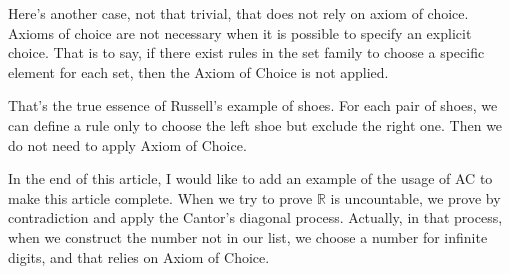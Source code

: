 \documentclass{article}
\newcommand\Real{\mathbb{R}}
\begin{document}
Here's another case, not that trivial, that does not rely on axiom of choice. Axioms of choice are not necessary when it is possible to specify an explicit choice. That is to say, if there exist rules in the set family to choose a specific element for each set, then the Axiom of Choice is not applied.

That's the true essence of Russell's example of shoes. For each pair of shoes, we can define a rule only to choose the left shoe but exclude the right one. Then we do not need to apply Axiom of Choice.

In the end of this article, I would like to add an example of the usage of AC to make this article complete. When we try to prove $\Real$ is uncountable, we prove by contradiction and apply the Cantor's diagonal process. Actually, in that process, when we construct the number not in our list, we choose a number for infinite digits, and that relies on Axiom of Choice.
\end{document}
